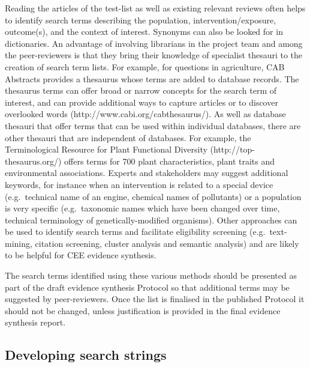 \documentclass[
  letterpaper,
  DIV=11,
  numbers=noendperiod]{scrreprt}
\begin{document}
Reading the articles of the test-list as well as existing relevant
reviews often helps to identify search terms describing the population,
intervention/exposure, outcome(s), and the context of interest. Synonyms
can also be looked for in dictionaries. An advantage of involving
librarians in the project team and among the peer-reviewers is that they
bring their knowledge of specialist thesauri to the creation of search
term lists. For example, for questions in agriculture, CAB Abstracts
provides a thesaurus whose terms are added to database records. The
thesaurus terms can offer broad or narrow concepts for the search term
of interest, and can provide additional ways to capture articles or to
discover overlooked words (http://www.cabi.org/cabthesaurus/). As well
as database thesauri that offer terms that can be used within individual
databases, there are other thesauri that are independent of databases.
For example, the Terminological Resource for Plant Functional Diversity
(http://top-thesaurus.org/) offers terms for 700 plant characteristics,
plant traits and environmental associations. Experts and stakeholders
may suggest additional keywords, for instance when an intervention is
related to a special device (e.g.~technical name of an engine, chemical
names of pollutants) or a population is very specific (e.g.~taxonomic
names which have been changed over time, technical terminology of
genetically-modified organisms). Other approaches can be used to
identify search terms and facilitate eligibility screening
(e.g.~text-mining, citation screening, cluster analysis and semantic
analysis) and are likely to be helpful for CEE evidence synthesis.

The search terms identified using these various methods should be
presented as part of the draft evidence synthesis Protocol so that
additional terms may be suggested by peer-reviewers. Once the list is
finalised in the published Protocol it should not be changed, unless
justification is provided in the final evidence synthesis report.

\subsection{Developing search strings}\label{developing-search-strings}
\end{document}
